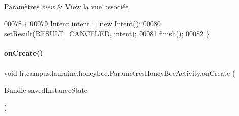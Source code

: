 \begin{DoxyParams}{Paramètres}
{\em view} & View la vue associée \\
\hline
\end{DoxyParams}

\begin{DoxyCode}
00078     \{
00079         Intent intent = \textcolor{keyword}{new} Intent();
00080         setResult(RESULT\_CANCELED, intent);
00081         finish();
00082     \}
\end{DoxyCode}
\mbox{\label{classfr_1_1campus_1_1laurainc_1_1honeybee_1_1_parametres_honey_bee_activity_a43786040ab7dbe39e90bfc684b4c40f7}} 
\paragraph{\texorpdfstring{on\+Create()}{onCreate()}}
{\footnotesize\ttfamily void fr.\+campus.\+laurainc.\+honeybee.\+Parametres\+Honey\+Bee\+Activity.\+on\+Create (\begin{DoxyParamCaption}\item[{Bundle}]{saved\+Instance\+State }\end{DoxyParamCaption})\hspace{0.3cm}{\ttfamily [protected]}}


